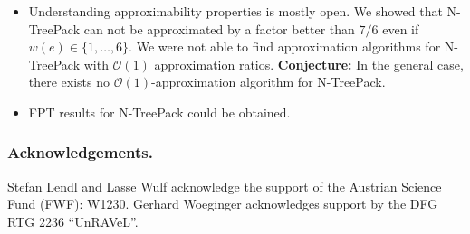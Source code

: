 \documentclass[runningheads]{llncs}
\newcommand{\set}[1]{\{ #1 \}}
\newcommand{\fromto}[2]{\set{#1, \ldots, #2}}
\newcommand{\bigO}{\mathcal{O}}
\newcommand{\xxxNTP}{{\sc N-TreePack}}
\begin{document}
\begin{itemize}
\item Understanding approximability properties is mostly open. We showed that {\xxxNTP} can not be approximated 
by a factor better than $7/6$ even if $w(e) \in \fromto{1}{6}$. 
We were not able to find approximation algorithms for {\xxxNTP} with $\bigO(1)$ approximation ratios. 
\textbf{Conjecture:} In the general case, there exists no $\bigO(1)$-approximation algorithm for {\xxxNTP}.
\item FPT results for {\xxxNTP} could be obtained. 
\end{itemize}


\subsubsection*{Acknowledgements.}

Stefan Lendl and Lasse Wulf acknowledge the support of the Austrian Science Fund (FWF): W1230.
Gerhard Woeginger acknowledges support by the DFG RTG 2236 ``UnRAVeL''.

%
%





\appendix

\label{appendix:hamilton_prime}
\hamiltonPrime*
\end{document}
